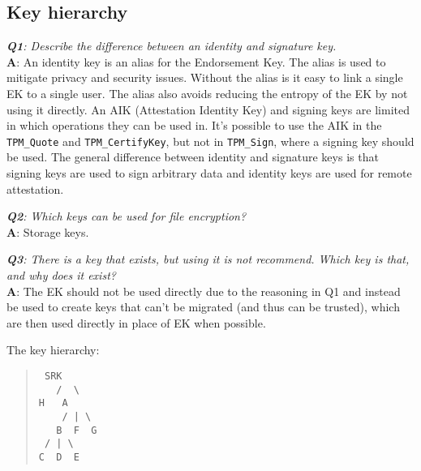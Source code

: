 \documentclass[10pt]{article}
\newcommand{\command}[1]{\texttt{#1}}
\newcommand{\Q}[2]{\textit{\textbf{Q#1}: #2}}
\newcommand{\A}[1]{\textbf{A}: #1}
\begin{document}
  \subsection{Key hierarchy}

    \Q{1}{Describe the difference between an identity and signature key.}\\
    \A{
      An identity key is an alias for the Endorsement Key. The alias is used
      to mitigate privacy and security issues. Without the alias is it easy to
      link a single EK to a single user. The alias also avoids reducing the
      entropy of the EK by not using it directly. An AIK (Attestation Identity
      Key) and signing keys are limited in which operations they can be used
      in. It's possible to use the AIK in the \command{TPM\_Quote} and
      \command{TPM\_CertifyKey}, but not in \command{TPM\_Sign}, where a
      signing key should be used. The general difference between identity and
      signature keys is that signing keys are used to sign arbitrary data and
      identity keys are used for remote attestation.
  }

    \Q{2}{Which keys can be used for file encryption?}\\
    \A{Storage keys.}

    \Q{3}{
      There is a key that exists, but using it is not recommend. Which key
      is that, and why does it exist?
    }\\
    \A{
      The EK should not be used directly due to the reasoning in Q1 and
      instead be used to create keys that can't be migrated (and thus can be
      trusted), which are then used directly in place of EK when possible.
    }

    The key hierarchy:
    \begin{quote}
      \texttt{
SRK\ \\
\ \ \ /\ \ \textbackslash \\
H\ \ \ A \\
\ \ \ \ /\ |\ \textbackslash \\
\ \ \ B\ \ F\ \ G \\
\ /\ |\ \textbackslash \\
C\ \ D\ \ E \\
      }
    \end{quote}
\end{document}
